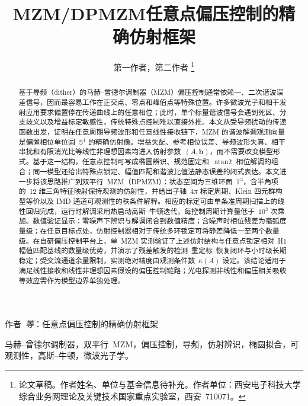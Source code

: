 \documentclass[11pt,journal,onecolumn]{IEEEtran}
\theoremstyle{plain}
\theoremstyle{remark}
\newcommand{\bv}{\mathbf{b}}
\newcommand{\atan}{\operatorname{atan2}}
\begin{document}
\title{MZM/DPMZM任意点偏压控制的精确仿射框架}

\author{第一作者，第二作者%
\thanks{论文草稿。作者姓名、单位与基金信息待补充。作者单位：西安电子科技大学综合业务网理论及关键技术国家重点实验室，西安~710071。}}

%
{作者~\MakeLowercase{\textit{等}}：任意点偏压控制的精确仿射框架}

\maketitle

\begin{abstract}
基于导频（dither）的马赫--曾德尔调制器（MZM）偏压控制通常依赖一、二次谐波误差信号，因而最容易工作在正交点、零点和峰值点等特殊位置。许多微波光子和相干发射应用要求偏置停在传递曲线上的任意相位；此时，单个标量谐波信号会遇到死区、分支歧义以及增益标定敏感性，传统特殊点控制难以直接外推。本文从受导频扰动的传递函数出发，证明在任意周期导频波形和任意线性接收链下，MZM 的谐波解调观测向量是偏置相位单位圆~$\mathbb{S}^1$ 的精确仿射像。增益失配、参考相位误差、导频波形失真、相干串扰和有限消光比等线性非理想因素均进入仿射参数~$(A,\bv)$，而不需要改变模型形式。基于这一结构，任意点控制可写成椭圆辨识、规范固定和~$\atan$ 相位解调的组合；同一模型还给出特殊点锁定、幅值匹配和谐波比值法静态误差的闭式表达。本文进一步将该思路推广到双平行~MZM（DPMZM）：状态空间为三维环面~$\mathbb{T}^3$，含半角项的~12 维三角特征映射保持观测的仿射性，并给出子轴~$4\pi$ 标定周期、Klein 四元群构型等价以及 IMD 通道可观测性的秩条件解释。相应的标定可由单条准周期扫描上的线性回归完成，运行时解调采用热启动高斯--牛顿迭代，每控制周期计算量低于~$10^3$ 次乘加。数值验证显示：零噪声下辨识与解调闭合到数值精度；含噪声时相位残差为毫弧度量级；在任意目标点处，仿射控制器相对于传统多环锁定可将静差降低一至两个数量级。在自研偏压控制平台上，单~MZM 实测验证了上述仿射结构与任意点锁定相对~H1 幅值匹配基线的数量级优势，并演示了残差触发的检测--重定标--恢复闭环与小时级长期稳定；受交流通道余量限制，实测绝对精度由观测条件数~$\kappa(A)$ 设定。该结论适用于满足线性接收和线性非理想因素假设的偏压控制链路；光电探测非线性和偏压相关吸收等效应需作为模型边界单独处理。
\end{abstract}

\begin{IEEEkeywords}
马赫--曾德尔调制器，双平行~MZM，偏压控制，导频，仿射辨识，椭圆拟合，可观测性，高斯--牛顿，微波光子学。
\end{IEEEkeywords}

\IEEEpeerreviewmaketitle
\setlength{\emergencystretch}{2em}
\end{document}
